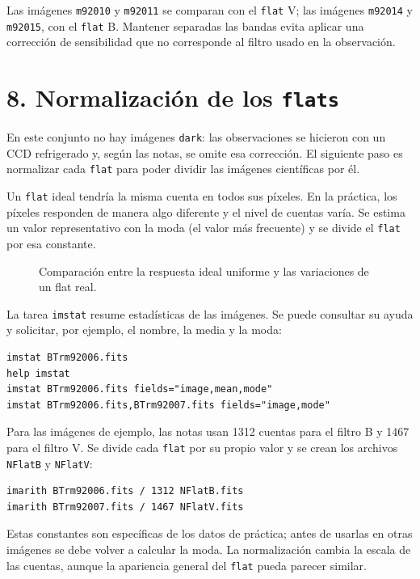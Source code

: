\documentclass[11pt,twocolumn]{article}
\newcommand{\widefigure}[2]{\begin{figure}[!t]\centering\caption{#2}\end{figure}}
\begin{document}
Las imágenes \texttt{m92010} y \texttt{m92011} se comparan con el
\texttt{flat} V; las imágenes \texttt{m92014} y \texttt{m92015}, con el
\texttt{flat} B. Mantener separadas las bandas evita aplicar una corrección de
sensibilidad que no corresponde al filtro usado en la observación.

\section*{8. Normalización de los \texttt{flats}}

En este conjunto no hay imágenes \texttt{dark}: las observaciones se hicieron
con un CCD refrigerado y, según las notas, se omite esa corrección. El siguiente
paso es normalizar cada \texttt{flat} para poder dividir las imágenes
científicas por él.

Un \texttt{flat} ideal tendría la misma cuenta en todos sus píxeles. En la
práctica, los píxeles responden de manera algo diferente y el nivel de cuentas
varía. Se estima un valor representativo con la moda (el valor más frecuente)
y se divide el \texttt{flat} por esa constante.

\widefigure{figuras/flat_pixeles.tex}{Comparación entre la respuesta ideal uniforme y las variaciones de un flat real.}

La tarea \texttt{imstat} resume estadísticas de las imágenes. Se puede
consultar su ayuda y solicitar, por ejemplo, el nombre, la media y la moda:

\begin{verbatim}
imstat BTrm92006.fits
help imstat
imstat BTrm92006.fits fields="image,mean,mode"
imstat BTrm92006.fits,BTrm92007.fits fields="image,mode"
\end{verbatim}

Para las imágenes de ejemplo, las notas usan 1312 cuentas para el filtro B y
1467 para el filtro V. Se divide cada \texttt{flat} por su propio valor y se
crean los archivos \texttt{NFlatB} y \texttt{NFlatV}:

\begin{verbatim}
imarith BTrm92006.fits / 1312 NFlatB.fits
imarith BTrm92007.fits / 1467 NFlatV.fits
\end{verbatim}

Estas constantes son específicas de los datos de práctica; antes de usarlas en
otras imágenes se debe volver a calcular la moda. La normalización cambia la
escala de las cuentas, aunque la apariencia general del \texttt{flat} pueda
parecer similar.
\end{document}
